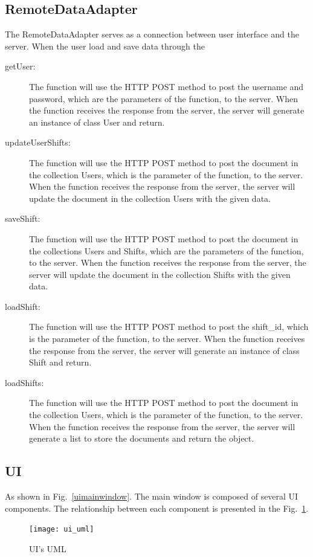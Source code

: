 \documentclass[11pt, oneside]{article}   	%
\begin{document}
\subsection{RemoteDataAdapter}
The RemoteDataAdapter serves as a connection between user interface and the server. When the user load and save data through the 
\begin{description}
\item[getUser:]The function will use the HTTP POST method to post the username and password, which are the parameters of the function, to the server. When the function receives the response from the server, the server will generate an instance of class User and return.
\item[updateUserShifts:]The function will use the HTTP POST method to post the document in the collection Users, which is the parameter of the function, to the server. When the function receives the response from the server, the server will update the document in the collection Users with the given data.
\item[saveShift:]The function will use the HTTP POST method to post the document in the collections Users and Shifts, which are the parameters of the function, to the server. When the function receives the response from the server, the server will update the document in the collection Shifts with the given data.
\item[loadShift:]The function will use the HTTP POST method to post the shift\_id, which is the parameter of the function, to the server. When the function receives the response from the server, the server will generate an instance of class Shift and return.
\item[loadShifts:]The function will use the HTTP POST method to post the document in the collection Users, which is the parameter of the function, to the server. When the function receives the response from the server, the server will generate a list to store the documents and return the object.
\end{description}


\subsection{UI}
As shown in Fig.~\ref{uimainwindow}. The main window is composed of several UI components. The relationship between each component is presented in the Fig.~\ref{uiuml}.
\begin{figure}
\centering
\texttt{[image: ui\_uml]}
\caption{UI's UML}
\label{uiuml}
\end{figure}
\end{document}
